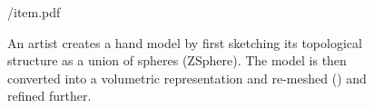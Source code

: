 \begin{figure}[t!]
\centering
\begin{overpic} 
[width=\linewidth]
{\currfiledir/item.pdf}
\end{overpic}
\caption{
% 
%
An artist creates a hand model by first sketching its topological structure as a union of spheres (ZSphere). The model is then converted into a volumetric representation and re-meshed () and refined further.
% 
% 
}
\label{fig:zsphere}
\end{figure}